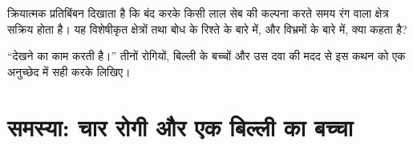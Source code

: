 \begin{exercise}[$\star\star\star$]\label{exo:g11:vision-and-brain:14}
क्रियात्मक प्रतिबिंबन दिखाता है कि  बंद करके किसी लाल सेब की कल्पना
करते समय रंग वाला क्षेत्र सक्रिय होता है। यह विशेषीकृत क्षेत्रों तथा बोध के
रिश्ते के बारे में, और विभ्रमों के बारे में, क्या कहता है?
\end{exercise}

\begin{exercise}[$\star\star\star$]\label{exo:g11:vision-and-brain:15}
``देखने का काम  करती है।'' तीनों रोगियों, बिल्ली के बच्चों और उस दवा की
मदद से इस कथन को एक अनुच्छेद में सही करके लिखिए।
\end{exercise}

\section{समस्या: चार रोगी और एक बिल्ली का बच्चा}

